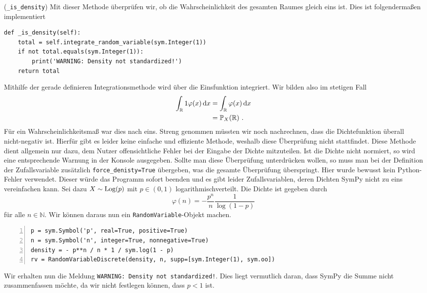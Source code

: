 \begin{Code}{(\lstinline|_is_density|)}
Mit dieser Methode überprüfen wir, ob die Wahrscheinlichkeit des gesamten Raumes gleich eins ist. Dies ist folgendermaßen implementiert
\begin{lstlisting}
def _is_density(self):
    total = self.integrate_random_variable(sym.Integer(1))
    if not total.equals(sym.Integer(1)):
        print('WARNING: Density not standardized!')
    return total
\end{lstlisting}
Mithilfe der gerade definieren Integrationsmethode wird über die Einsfunktion integriert. Wir bilden also im stetigen Fall
\begin{align*}
\int_\mathbb{R} 1 \varphi(x) \mathop{}\!\mathrm{d} x &= \int_\mathbb{R} \varphi(x)  \mathop{}\!\mathrm{d} x\\
&= \mathbb{P}_X(\mathbb{R})~.
\end{align*}
Für ein Wahrscheinlichkeitsmaß war dies nach \hyperlink{Def:Maß}{} eins. Streng genommen müssten wir noch nachrechnen, dass die Dichtefunktion überall nicht-negativ ist. Hierfür gibt es leider keine einfache und effiziente Methode, weshalb diese Überprüfung nicht stattfindet. Diese Methode dient allgemein nur dazu, dem Nutzer offensichtliche Fehler bei der Eingabe der Dichte mitzuteilen. Ist die Dichte nicht normiert, so wird eine entsprechende Warnung in der Konsole ausgegeben. Sollte man diese Überprüfung unterdrücken wollen, so muss man bei der Definition der Zufallsvariable zusätzlich \lstinline|force_denisty=True| übergeben, was die gesamte Überprüfung überspringt. Hier wurde bewusst kein Python-Fehler verwendet. Dieser würde das Programm sofort beenden und es gibt leider Zufallsvariablen, deren Dichten SymPy nicht zu eins vereinfachen kann. Sei dazu $X \sim \operatorname{Log}(p)$ mit $p \in (0, 1)$ logarithmischverteilt. Die Dichte ist gegeben durch
\[\varphi(n) = - \frac{p^n}{n} \frac{1}{\log(1 - p)}\]
für alle $n \in \mathbb{N}$. Wir können daraus nun ein \lstinline|RandomVariable|-Objekt machen.
\begin{lstlisting}[numbers=left, numberstyle=\tiny\color{codegray}]
p = sym.Symbol('p', real=True, positive=True)
n = sym.Symbol('n', integer=True, nonnegative=True)
density = - p**n / n * 1 / sym.log(1 - p)
rv = RandomVariableDiscrete(density, n, supp=[sym.Integer(1), sym.oo])
\end{lstlisting}
Wir erhalten nun die Meldung \lstinline|WARNING: Density not standardized!|. Dies liegt vermutlich daran, dass SymPy die Summe nicht zusammenfassen möchte, da wir nicht festlegen können, dass $p < 1$ ist.
\end{Code}


